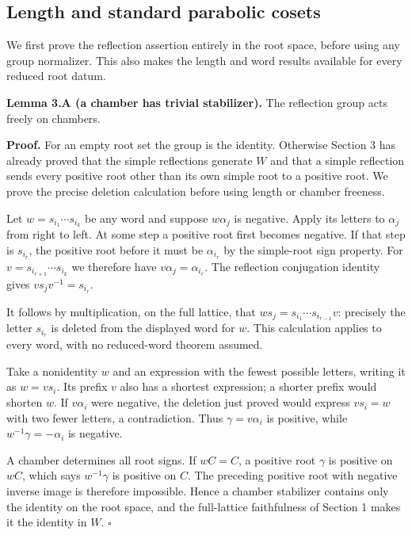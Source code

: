 \documentclass[11pt,a4paper,openany]{report}
\begin{document}
\subsection{Length and standard parabolic cosets}\label{AG-RG-04-length-and-standard-parabolic-cosets}

We first prove the reflection assertion entirely in the root space, before using any group normalizer. This also makes the length and word results available for every reduced root datum.

\textbf{Lemma 3.A (a chamber has trivial stabilizer).} The reflection group acts freely on chambers.

\textbf{Proof.} For an empty root set the group is the identity. Otherwise Section 3 has already proved that the simple reflections generate \(W\) and that a simple reflection sends every positive root other than its own simple root to a positive root. We prove the precise deletion calculation before using length or chamber freeness.

Let \(w=s_{i_1}\cdots s_{i_k}\) be any word and suppose \(w\alpha_j\) is negative. Apply its letters to \(\alpha_j\) from right to left. At some step a positive root first becomes negative. If that step is \(s_{i_r}\), the positive root before it must be \(\alpha_{i_r}\) by the simple-root sign property. For \(v=s_{i_{r+1}}\cdots s_{i_k}\) we therefore have \(v\alpha_j=\alpha_{i_r}\). The reflection conjugation identity gives \(v s_jv^{-1}=s_{i_r}\).

It follows by multiplication, on the full lattice, that \(w s_j=s_{i_1}\cdots s_{i_{r-1}}v\): precisely the letter \(s_{i_r}\) is deleted from the displayed word for \(w\). This calculation applies to every word, with no reduced-word theorem assumed.

Take a nonidentity \(w\) and an expression with the fewest possible letters, writing it as \(w=v s_i\). Its prefix \(v\) also has a shortest expression; a shorter prefix would shorten \(w\). If \(v\alpha_i\) were negative, the deletion just proved would express \(v s_i=w\) with two fewer letters, a contradiction. Thus \(\gamma=v\alpha_i\) is positive, while \(w^{-1}\gamma=-\alpha_i\) is negative.

A chamber determines all root signs. If \(wC=C\), a positive root \(\gamma\) is positive on \(wC\), which says \(w^{-1}\gamma\) is positive on \(C\). The preceding positive root with negative inverse image is therefore impossible. Hence a chamber stabilizer contains only the identity on the root space, and the full-lattice faithfulness of Section 1 makes it the identity in \(W\). \(\square\)
\end{document}
